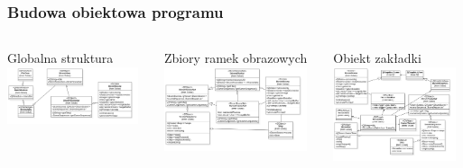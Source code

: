\documentclass[aspectratio=169]{beamer}
\begin{document}
\begin{frame}
    \frametitle{Budowa obiektowa programu}

    \begin{columns}[c]
        Globalna struktura
        \includegraphics[width=0.95\textwidth]{img/uml/global-sturcture.png}

        Zbiory ramek obrazowych
        \includegraphics[width=0.95\textwidth]{img/uml/sokar-scene-sets.png}

        Obiekt zakładki
        \includegraphics[width=0.95\textwidth]{img/uml/dicom-view.png}

    \end{columns}

\end{frame}
\end{document}
